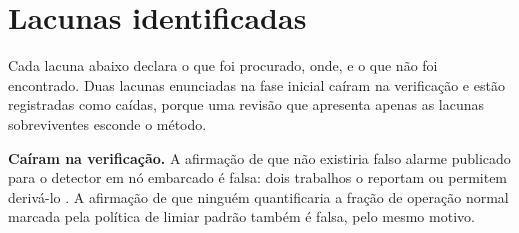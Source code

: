 \section{Lacunas identificadas}
\label{sec:rev-lacunas}

Cada lacuna abaixo declara o que foi procurado, onde, e o que não foi encontrado. Duas
lacunas enunciadas na fase inicial caíram na verificação e estão registradas como caídas,
porque uma revisão que apresenta apenas as lacunas sobreviventes esconde o método.

\textbf{Caíram na verificação.} A afirmação de que não existiria falso alarme publicado
para o detector em nó embarcado é falsa: dois trabalhos o reportam ou permitem derivá-lo
\cite{chevtchenko2023,kolok2025}. A afirmação de que ninguém quantificaria a fração de
operação normal marcada pela política de limiar padrão também é falsa, pelo mesmo motivo.

